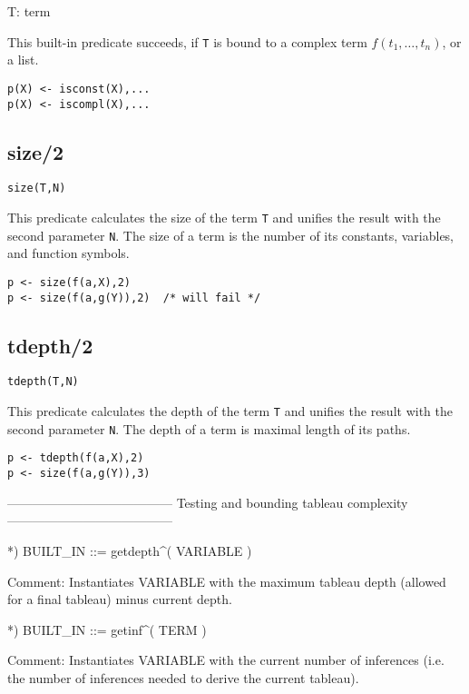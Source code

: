 T: term


This built-in predicate succeeds, if {\tt T} is
bound to a complex term $f(t_1,\ldots,t_n)$, or a list.
\begin{verbatim}
p(X) <- isconst(X),...
p(X) <- iscompl(X),...
\end{verbatim}

\subsection{size/2}

{\tt size(T,N)}

This predicate calculates the size of the term {\tt T} and
unifies the result with the second parameter {\tt N}.
The size of a term is the number of its constants, variables, and
function symbols.
\begin{verbatim}
p <- size(f(a,X),2)
p <- size(f(a,g(Y)),2)  /* will fail */
\end{verbatim}

\subsection{tdepth/2}

{\tt tdepth(T,N)}

This predicate calculates the depth of the term {\tt T} and
unifies the result with the second parameter {\tt N}.
The depth of a term is maximal length of its paths.
\begin{verbatim}
p <- tdepth(f(a,X),2)
p <- size(f(a,g(Y)),3) 
\end{verbatim}


---------------------------------------
Testing and bounding tableau complexity
---------------------------------------


*) BUILT_IN ::= getdepth^( VARIABLE ) 

   Comment: Instantiates VARIABLE with the maximum tableau depth 
            (allowed for a final tableau) minus current depth.

*) BUILT_IN ::= getinf^( TERM ) 

   Comment: Instantiates VARIABLE with the current number
   	    of inferences (i.e. the number of inferences needed
	    to derive the current tableau).

